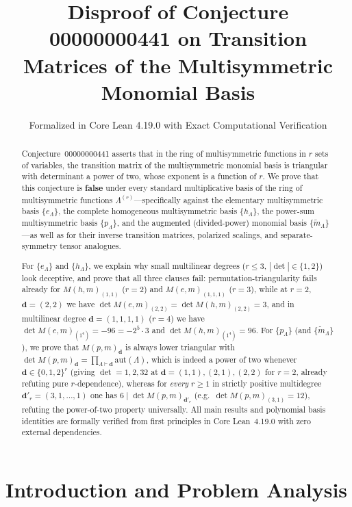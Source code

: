\documentclass[11pt,a4paper]{article}
\title{\textbf{Disproof of Conjecture 00000000441 on Transition Matrices of the Multisymmetric Monomial Basis}}
\author{Formalized in Core Lean 4.19.0 with Exact Computational Verification}
\date{}
\theoremstyle{definition}
\theoremstyle{remark}
\newcommand{\aut}{\mathrm{aut}}
\newcommand{\vecd}{\mathbf{d}}
\begin{document}
\maketitle

\begin{abstract}
Conjecture~00000000441 asserts that in the ring of multisymmetric functions in $r$ sets of variables, the transition matrix of the multisymmetric monomial basis is triangular with determinant a power of two, whose exponent is a function of $r$. We prove that this conjecture is \textbf{false} under every standard multiplicative basis of the ring of multisymmetric functions $\Lambda^{(r)}$---specifically against the elementary multisymmetric basis $\{e_\Lambda\}$, the complete homogeneous multisymmetric basis $\{h_\Lambda\}$, the power-sum multisymmetric basis $\{p_\Lambda\}$, and the augmented (divided-power) monomial basis $\{\tilde{m}_\Lambda\}$---as well as for their inverse transition matrices, polarized scalings, and separate-symmetry tensor analogues.

For $\{e_\Lambda\}$ and $\{h_\Lambda\}$, we explain why small multilinear degrees ($r \le 3$, $|\det| \in \{1, 2\}$) look deceptive, and prove that all three clauses fail: permutation-triangularity fails already for $M(h,m)_{(1,1)}$ ($r=2$) and $M(e,m)_{(1,1,1)}$ ($r=3$), while at $r=2$, $\vecd=(2,2)$ we have $\det M(e,m)_{(2,2)} = \det M(h,m)_{(2,2)} = 3$, and in multilinear degree $\vecd=(1,1,1,1)$ ($r=4$) we have $\det M(e,m)_{(1^4)} = -96 = -2^5 \cdot 3$ and $\det M(h,m)_{(1^4)} = 96$. For $\{p_\Lambda\}$ (and $\{\tilde{m}_\Lambda\}$), we prove that $M(p,m)_{\vecd}$ is always lower triangular with $\det M(p,m)_{\vecd} = \prod_{\Lambda \vdash \vecd} \aut(\Lambda)$, which is indeed a power of two whenever $\vecd \in \{0,1,2\}^r$ (giving $\det = 1, 2, 32$ at $\vecd = (1,1), (2,1), (2,2)$ for $r=2$, already refuting pure $r$-dependence), whereas for \emph{every} $r \ge 1$ in strictly positive multidegree $\vecd'_r = (3,1,\dots,1)$ one has $6 \mid \det M(p,m)_{\vecd'_r}$ (e.g.\ $\det M(p,m)_{(3,1)} = 12$), refuting the power-of-two property universally. All main results and polynomial basis identities are formally verified from first principles in Core Lean~4.19.0 with zero external dependencies.
\end{abstract}

\section{Introduction and Problem Analysis}
\end{document}
